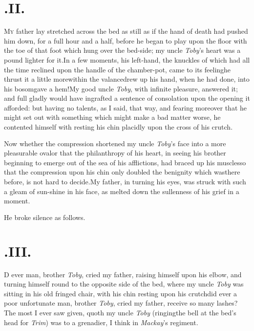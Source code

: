 \documentclass{article}
\begin{document}
\section{.\enspace II.}

\lettrine{M}{y} father lay stretched across the
bed as still as if the hand of death had pushed him down, for a
full hour and a half, before he began to play upon the floor
with the toe of that foot which hung over the bed-side; my uncle
\textit{Toby}’s heart was a pound lighter for
it.\tsh In a few moments, his left-hand, the knuckles of
which had all the time reclined upon the handle of the chamber-pot,
came to its feeling\tsk he thrust it a little more\pb within the
valance\tsk drew up his hand, when he had done, into his
bosom\tsk gave a hem!\tsk My good uncle \textit{Toby}, with infinite
pleasure, answered it; and full gladly would have ingrafted a
sentence of consolation upon the opening it afforded: but having no
talents, as I said, that way, and fearing moreover that he might
set out with something which might make a bad matter worse, he
contented himself with resting his chin placidly upon the cross of
his crutch.

Now whether the compression shortened my uncle
\textit{Toby}’s face into a more pleasurable oval\tsk or that
the philanthropy of his heart, in seeing his brother beginning to
emerge out of the sea of his afflictions, had braced up his
muscles\tsh so that the compression upon his chin only
doubled the benignity which was\pb there before, is not hard to
decide.\tsk My father, in turning his eyes, was struck
with such a gleam of sun-shine in his face, as melted down the
sullenness of his grief in a moment.

He broke silence as follows.

\section{.\enspace III.}

\lettrine{D}{} ever man, brother \textit{Toby}, cried\break
my father, raising himself upon\break
his elbow, and turning himself round to the opposite side of
the bed, where my uncle \textit{Toby} was sitting in his old
fringed chair, with his chin resting upon his\break
crutch\tsk did ever a poor unfortunate man, brother
\textit{Toby}, cried my father, receive so many lashes?\tsh
The most I ever saw given, quoth my uncle \textit{Toby}
(ringing\pb the bell at the bed’s head for \textit{Trim})
was to a grenadier, I think in \textit{Mackay}’s regiment.
\end{document}
